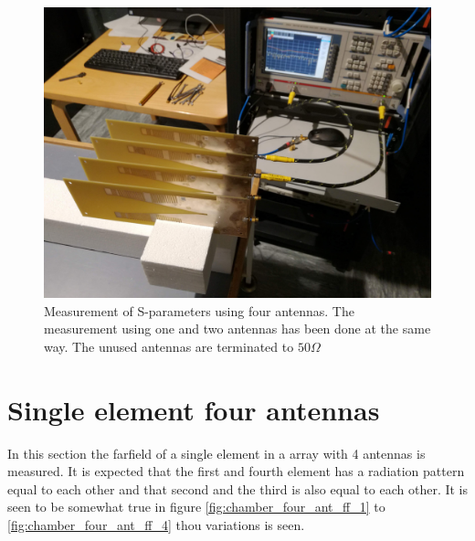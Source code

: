 \begin{figure}[H]
\centering 
\includegraphics[scale = 0.08]{figures/measurement/antennas/spar_meas.jpg}
\caption{Measurement of S-parameters using four antennas. The measurement using one and two antennas has been done at the same way. The unused antennas are terminated to $50\Omega$}
\label{fig:spar_meas}
\end{figure} 


\section{Single element four antennas}
In this section the farfield of a single element in a array with 4 antennas is measured. It is expected that the first and fourth element has a radiation pattern equal to each other and that second and the third is also equal to each other. It is seen to be somewhat true in figure \ref{fig:chamber_four_ant_ff_1} to \ref{fig:chamber_four_ant_ff_4} thou variations is seen.     


